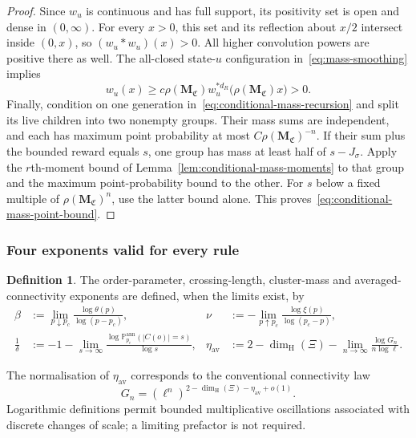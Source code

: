 \documentclass[scheme=plain,11pt]{ctexart}
\theoremstyle{definition}
\newtheorem{definition}[theorem]{Definition}
\theoremstyle{remark}
\newcommand{\dimhaus}{\dim_{\mathrm H}}
\begin{document}
\begin{proof}
Since $w_u$ is continuous and has full support, its positivity set is open and dense in $(0,\infty)$.
For every $x>0$, this set and its reflection about $x/2$ intersect inside $(0,x)$, so $(w_u*w_u)(x)>0$.
All higher convolution powers are positive there as well.
The all-closed state-$u$ configuration in~\eqref{eq:mass-smoothing} implies
\[
 w_u(x)\ge c\rho(\mathbf M_{\mathfrak C})
 w_u^{*d_R}\bigl(\rho(\mathbf M_{\mathfrak C})x\bigr)>0.
\]
Finally, condition on one generation in~\eqref{eq:conditional-mass-recursion} and split its live children into two nonempty groups.
Their mass sums are independent, and each has maximum point probability at most $C\rho(\mathbf M_{\mathfrak C})^{-n}$.
If their sum plus the bounded reward equals $s$, one group has mass at least half of $s-J_\sigma$.
Apply the $r$th-moment bound of Lemma~\ref{lem:conditional-mass-moments} to that group and the maximum point-probability bound to the other.
For $s$ below a fixed multiple of $\rho(\mathbf M_{\mathfrak C})^n$, use the latter bound alone.
This proves~\eqref{eq:conditional-mass-point-bound}.
\end{proof}


\subsubsection*{Four exponents valid for every rule}
\begin{definition}\label{def:four-exponents}
The order-parameter, crossing-length, cluster-mass and averaged-connectivity exponents are defined, when the limits exist, by
\begin{align*}
 \beta&:=\lim_{p\downarrow p_c}\frac{\log\theta(p)}{\log(p-p_c)},&
 \nu&:=-\lim_{p\uparrow p_c}\frac{\log\xi(p)}{\log(p_c-p)},\\
 \frac1\delta&:=-1-\lim_{s\to\infty}
 \frac{\log\mathbb P_{p_c}^{\mathrm{ann}}(|C(o)|=s)}{\log s},&
 \eta_{\mathrm{av}}&:=2-\dimhaus(\Xi)
 -\lim_{n\to\infty}\frac{\log G_n}{n\log\ell}.
\end{align*}
\end{definition}
The normalisation of $\eta_{\mathrm{av}}$ corresponds to the conventional connectivity law
\[
 G_n=(\ell^n)^{2-\dimhaus(\Xi)-\eta_{\mathrm{av}}+o(1)}.
\]
Logarithmic definitions permit bounded multiplicative oscillations associated with discrete changes of scale; a limiting prefactor is not required.
\end{document}
